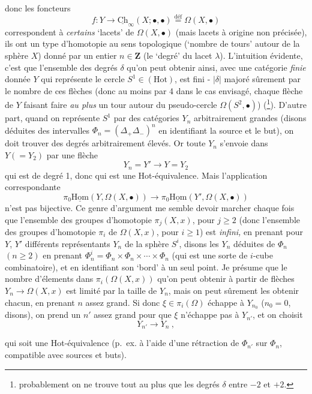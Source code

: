 \documentclass[11pt]{article}
\newcommand{\printedpage}[1]{\marginpar{\footnotesize p.~#1}}
\newcommand{\msp}[1]{\marginpar{\footnotesize [#1]}}
\newcommand{\Ch}{\underline{\mathrm{Ch}}}
\newcommand{\Hot}{\mathrm{Hot}}
\newcommand{\uHom}{\underline{\mathrm{Hom}}}
\begin{document}
\clearpage
\printedpage{83}

\msp{page 133}
donc les foncteurs
\[ f : Y\longrightarrow \Ch_\infty(X;\bullet,\bullet) \overset{\text{déf}}{=} \Omega(X,\bullet) \]
correspondent à \textit{certains} `lacets' de $\Omega(X,\bullet)$ (mais lacets à origine non précisée), ils ont un type d'homotopie au sens topologique (`nombre de tours' autour de la sphère $X$) donné par un entier $n\in\mathbf{Z}$ (le `degré' du lacet $\lambda$). L'intuition évidente, c'est que l'ensemble des degrés $\delta$ qu'on peut obtenir ainsi, avec une catégorie \textit{finie} donnée $Y$ qui représente le cercle $S^1\in(\Hot)$, est fini - $|\delta|$ majoré sûrement par le nombre de ces flèches (donc au moins par 4 dans le cas envisagé, chaque flèche de $Y$ faisant faire \textit{au plus} un tour autour du pseudo-cercle $\Omega(S^2,\bullet)$) (\footnote[28]{probablement on ne trouve tout au plus que les degrés $\delta$ entre $-2$ et $+2$.}). D'autre part, quand on représente $S^1$ par des catégories $Y_n$ arbitrairement grandes (disons déduites des intervalles $\Phi_n=(\Delta_+\Delta_-)^n$ en identifiant la source et le but), on doit trouver des degrés arbitrairement élevés. Or toute $Y_n$ s'envoie dans $Y(=Y_2)$ par une flèche
\[ Y_n = Y' \longrightarrow Y = Y_2 \]
\msp{page 134}
qui est de degré 1, donc qui est une Hot-équivalence. Mais l'application correspondante
\[ \pi_0\uHom(Y,\Omega(X,\bullet)) \longrightarrow \pi_0\uHom(Y',\Omega(X,\bullet)) \]
n'est pas bijective. Ce genre d'argument me semble devoir marcher chaque fois que l'ensemble des groupes d'homotopie $\pi_j(X,x)$, pour $j\geq 2$ (donc l'ensemble des groupes d'homotopie $\pi_i$ de $\Omega(X,x)$, pour $i\geq 1$) est \textit{infini,} en prenant pour $Y$, $Y'$ différents représentants $Y_n$ de la sphère $S^i$, disons les $Y_n$ déduites de $\Phi_n$ $(n\geq 2)$ en prenant $\Phi_n^i = \Phi_n\times\Phi_n\times\cdots\times\Phi_n$ (qui est une sorte de $i$-cube combinatoire), et en identifiant son `bord' à un seul point. Je présume que le nombre d'élements dans $\pi_i(\Omega(X,x))$ qu'on peut obtenir à partir de flèches $Y_n\longrightarrow\Omega(X,x)$ est limité par la taille de $Y_n$, mais on peut sûrement les obtenir chacun, en prenant $n$ assez grand. Si donc $\xi\in\pi_i(\Omega)$ échappe à $Y_{n_0}$ ($n_0=0$, disons), on prend un $n'$ assez grand pour que $\xi$ n'échappe pas à $Y_{n'}$, et on choisit %
\[ Y_{n'} \longrightarrow Y_n\ , \]


\msp{page 135}
qui soit une Hot-équivalence (p.~ex. à l'aide d'une rétraction de $\Phi_{n'}$ sur $\Phi_n$, compatible avec sources et buts).
\end{document}

